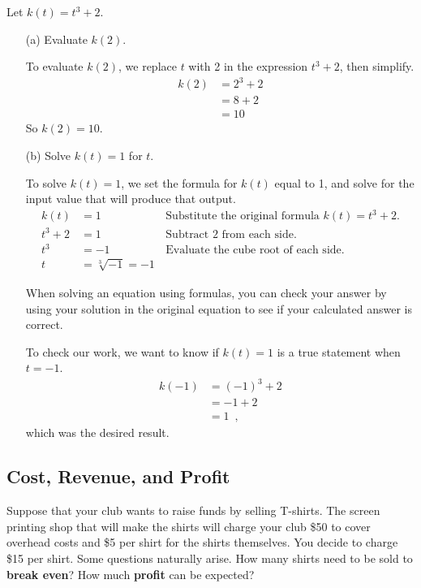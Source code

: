 \begin{example}
Let $k(t) = t^3 + 2$.
    \begin{itemize}
        \item[(a)] Evaluate $k(2)$.

        \begin{solution} To evaluate $k(2)$, we replace $t$ with 2 in the expression $t^3+2$, then simplify.
        \begin{align*}
            k(2) &= 2^3 + 2 \\
            &= 8 + 2 \\
            &= 10
        \end{align*}
        So $k(2) = 10$.
        \end{solution}
        \item[(b)] Solve $k(t) = 1$ for $t$.

        \begin{solution} To solve $k(t) = 1$, we set the formula for $k(t)$ equal to 1, and solve for the input value that will produce that output.
        \begin{align*}
            k(t)    &=  1 &\, \mbox{Substitute the original formula } k(t) = t^3 + 2.\\
            t^3 + 2 &=  1 &\, \mbox{Subtract 2 from each side}. \\
            t^3     &= -1 &\, \mbox{Evaluate the cube root of each side.}\\
            t       &= \sqrt[3]{-1} = -1
        \end{align*}

When solving an equation using formulas, you can check your answer by using your solution in the original equation to see if your calculated answer is correct.

To check our work, we want to know if $k(t)=1$ is a true statement when $t=-1$.
    \begin{align*}
        k(-1) &= (-1)^3 + 2 \\
              &= -1 + 2 \\
              &= 1 \enspace ,
          \end{align*}
which was the desired result.
\end{solution}
    \end{itemize}
\end{example}


\subsection{Cost, Revenue, and Profit}
\label{ssec:cost}
Suppose that your club wants to raise funds by selling T-shirts. The screen printing shop that will make the shirts will charge your club \$50 to cover overhead costs and \$5 per shirt for the shirts themselves. You decide to charge \$15 per shirt. Some questions naturally arise. How many shirts need to be sold to {\bf break even}? How much {\bf profit} can be expected?


